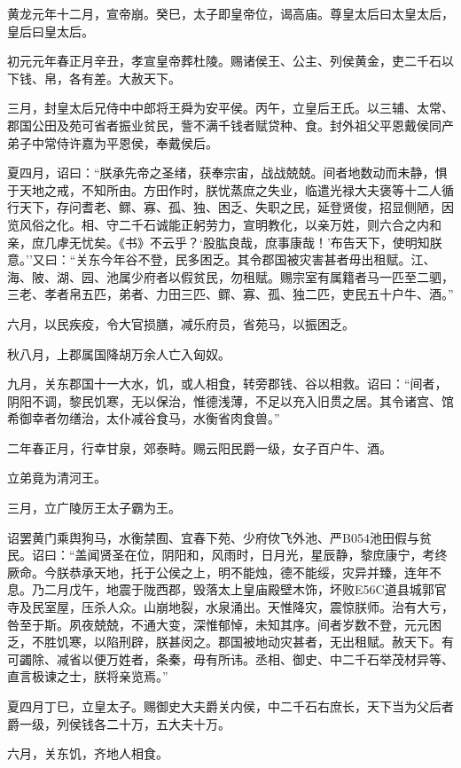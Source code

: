 \documentclass[]{article}
\begin{document}
黄龙元年十二月，宣帝崩。癸巳，太子即皇帝位，谒高庙。尊皇太后曰太皇太后，皇后曰皇太后。

初元元年春正月辛丑，孝宣皇帝葬杜陵。赐诸侯王、公主、列侯黄金，吏二千石以下钱、帛，各有差。大赦天下。

三月，封皇太后兄侍中中郎将王舜为安平侯。丙午，立皇后王氏。以三辅、太常、郡国公田及苑可省者振业贫民，訾不满千钱者赋贷种、食。封外祖父平恩戴侯同产弟子中常侍许嘉为平恩侯，奉戴侯后。

夏四月，诏曰：``朕承先帝之圣绪，获奉宗宙，战战兢兢。间者地数动而未静，惧于天地之戒，不知所由。方田作时，朕忧蒸庶之失业，临遣光禄大夫褒等十二人循行天下，存问耆老、鳏、寡、孤、独、困乏、失职之民，延登贤俊，招显侧陋，因览风俗之化。相、守二千石诚能正躬劳力，宣明教化，以亲万姓，则六合之内和亲，庶几虖无忧矣。《书》不云乎？`股肱良哉，庶事康哉！'布告天下，使明知朕意。''又曰：``关东今年谷不登，民多困乏。其令郡国被灾害甚者毋出租赋。江、海、陂、湖、园、池属少府者以假贫民，勿租赋。赐宗室有属籍者马一匹至二驷，三老、孝者帛五匹，弟者、力田三匹、鳏、寡、孤、独二匹，吏民五十户牛、酒。''

六月，以民疾疫，令大官损膳，减乐府员，省苑马，以振困乏。

秋八月，上郡属国降胡万余人亡入匈奴。

九月，关东郡国十一大水，饥，或人相食，转旁郡钱、谷以相救。诏曰：``间者，阴阳不调，黎民饥寒，无以保治，惟德浅薄，不足以充入旧贯之居。其令诸宫、馆希御幸者勿缮治，太仆减谷食马，水衡省肉食兽。''

二年春正月，行幸甘泉，郊泰畤。赐云阳民爵一级，女子百户牛、酒。

立弟竟为清河王。

三月，立广陵厉王太子霸为王。

诏罢黄门乘舆狗马，水衡禁囿、宜春下苑、少府佽飞外池、严B054池田假与贫民。诏曰：``盖闻贤圣在位，阴阳和，风雨时，日月光，星辰静，黎庶康宁，考终厥命。今朕恭承天地，托于公侯之上，明不能烛，德不能绥，灾异并臻，连年不息。乃二月戊午，地震于陇西郡，毁落太上皇庙殿壁木饰，坏败E56C道县城郭官寺及民室屋，压杀人众。山崩地裂，水泉涌出。天惟降灾，震惊朕师。治有大亏，咎至于斯。夙夜兢兢，不通大变，深惟郁悼，未知其序。间者岁数不登，元元困乏，不胜饥寒，以陷刑辟，朕甚闵之。郡国被地动灾甚者，无出租赋。赦天下。有可蠲除、减省以便万姓者，条秦，毋有所讳。丞相、御史、中二千石举茂材异等、直言极谏之士，朕将亲览焉。''

夏四月丁巳，立皇太子。赐御史大夫爵关内侯，中二千石右庶长，天下当为父后者爵一级，列侯钱各二十万，五大夫十万。

六月，关东饥，齐地人相食。
\end{document}
